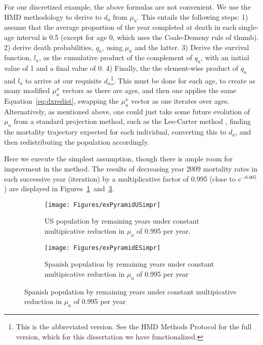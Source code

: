 For our discretized example, the above formulas are not convenient. We use the
HMD methodology to derive to $d_a$ from $\mu_a$. This entails the following
steps: 1) assume that the average proportion of the year completed at death in
each single-age interval is 0.5 (except for age 0, which uses the Coale-Demeny
rule of thumb). 2) derive death probabilities, $q_a$, using $\mu_a$ and the
latter. 3) Derive the survival function, $l_a$, as the cumulative product of
the complement of $q_a$, with an initial value of 1 and a final value of 0. 4)
Finally, the the element-wise product of $q_a$ and $l_a$ to arrive at our
requisite $d_a$\footnote{This is the abbreviated version. See the HMD Methods
Protocol \citep{wilmoth2007methods} for the full version, which for this
dissertation we have functionalized.}. This must be done for each age, to create as many modified $\mu _a^x $ vectors as there 
are ages, and then one applies the same Equation~\ref{eq:dxredist}, swapping the 
$\mu _a^x$ vector as one iterates over ages. Alternatively, as mentioned above,
one could just take some future evolution of $\mu_a$ from a standard projection method, such as the Lee-Carter method
\citep{lee1992modeling}, finding the mortality trajectory expected for each individual, converting
this to $d_a$, and then redistributing the population accordingly. 

Here we execute the simplest assumption, though there is ample room for
improvment in the method. The results of decreasing year 2009 mortality rates in each
successive year (iteration) by a multiplicative factor of 0.995 (close to
$e^{-0.005}$) are displayed in
Figures~\ref{fig:exPyrUSimpr}~and~\ref{fig:exPyrESimpr}.

\begin{figure}
        \centering
        \begin{subfigure}
                \centering
                \caption{US population by remaining years under
                constant multipicative reduction in $\mu_a$ of 0.995 per year.}
                \texttt{[image: Figures/exPyramidUSimpr]}
                \label{fig:exPyrUSimpr}
        \end{subfigure}
        \begin{subfigure}
                \centering
                \caption{Spanish population by remaining years under
                constant multipicative reduction in $\mu_a$ of 0.995 per year}
                \texttt{[image: Figures/exPyramidESimpr]}
                \label{fig:exPyrESimpr}
        \end{subfigure}
\end{figure}

